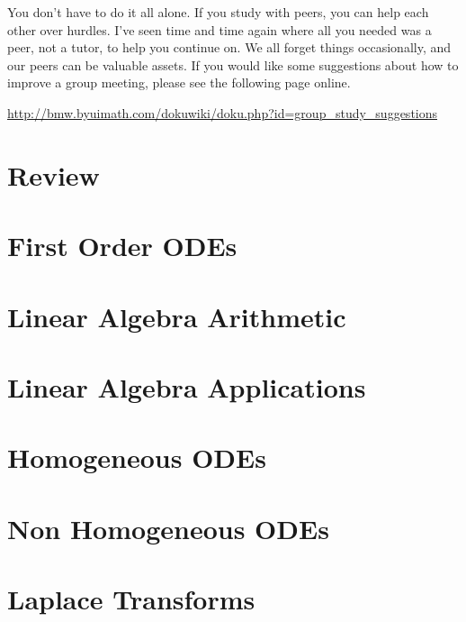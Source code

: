 \documentclass[letterpaper,oneside]{book}%
\theoremstyle{plain}
\theoremstyle{box}
\theoremstyle{problem}
\begin{document}
You don't have to do it all alone.  If you study with peers, you can help each other over hurdles. I've seen time and time again where all you needed was a peer, not a tutor, to help you continue on.  We all forget things occasionally, and our peers can be valuable assets.  If you would like some suggestions about how to improve a group meeting, please see the following page online.
\begin{center}
 \href{http://bmw.byuimath.com/dokuwiki/doku.php?id=group\_study\_suggestions}{http://bmw.byuimath.com/dokuwiki/doku.php?id=group\_study\_suggestions}
\end{center}
\mainmatter

\newcommand{\mysubsection}[1]{\subsection*{#1}\addcontentsline{toc}{subsection}{#1}}
\chapter{Review}





\chapter{First Order ODEs}




\chapter{Linear Algebra Arithmetic}





\chapter{Linear Algebra Applications}






\chapter{Homogeneous ODEs}





\chapter{Non Homogeneous ODEs}





\chapter{Laplace Transforms}


\end{document}
